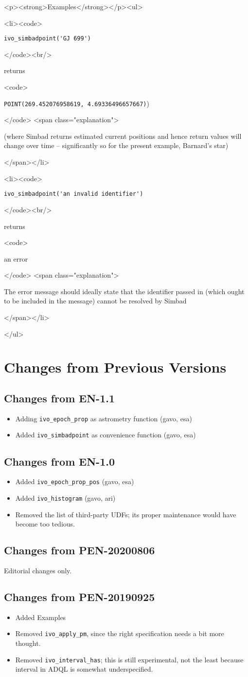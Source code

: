 \documentclass[11pt,a4paper]{ivoa}
\newenvironment{examples}%
{\begin{html}<p><strong>Examples</strong></p><ul>\end{html}%
  \def\example{\begin{html}<li><code>\end{html}}%
  \def\becomes{\begin{html}</code><br/>\end{html} returns
    \begin{html}<code>\end{html}}%
  \def\done##1.{\begin{html}</code> <span class="explanation">\end{html}
    ##1
    \begin{html}</span></li>\end{html}}}%
{\begin{html}</ul>\end{html}}
\begin{document}
\begin{examples}
\example \verb|ivo_simbadpoint('GJ 699')|
\becomes \verb|POINT(269.452076958619, 4.69336496657667)|)
\done (where Simbad returns estimated current positions and hence
return values will change over time -- significantly so for the present
example, Barnard's star).

\example \verb|ivo_simbadpoint('an invalid identifier')|
\becomes an error
\done The error message should ideally state that the identifier passed
in (which ought to be included in the message) cannot be resolved by Simbad.
\end{examples}

\appendix

\section{Changes from Previous Versions}

\subsection{Changes from EN-1.1}

\begin{itemize}
\item Adding \verb|ivo_epoch_prop| as astrometry function (gavo, esa)
\item Added \verb|ivo_simbadpoint| as convenience function (gavo, esa)
\end{itemize}

\subsection{Changes from EN-1.0}

\begin{itemize}
\item Added \verb|ivo_epoch_prop_pos| (gavo, esa)
\item Added \verb|ivo_histogram| (gavo, ari)
\item Removed the list of third-party UDFs; its proper maintenance would
have become too tedious.
\end{itemize}

\subsection{Changes from PEN-20200806}

Editorial changes only.

\subsection{Changes from PEN-20190925}

\begin{itemize}
\item Added Examples
\item Removed \verb|ivo_apply_pm|, since the right specification needs a
bit more thought.
\item Removed \verb|ivo_interval_has|; this is still experimental, not
the least because interval in ADQL is somewhat underspecified.
\end{itemize}


\end{document}
